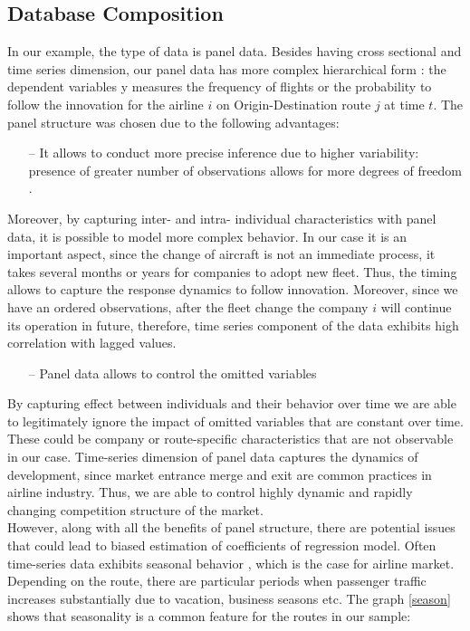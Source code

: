 \documentclass[titlepage, 11pt]{article}
\begin{document}
\subsection{Database Composition} \label{data composition}
\tab In our example, the type of data is panel data. Besides having cross sectional and time series dimension, our panel data has more complex hierarchical form \cite{Hsiao}: the dependent variables y measures the frequency of flights or the probability to follow the innovation for the airline $i$ on Origin-Destination route $j$ at time $t$.  The panel structure was chosen due to the following advantages\cite{Hsiao}: 
\begin{itemize}
\item[--] It allows to conduct more precise inference due to higher variability: presence of greater number of observations allows for more degrees of freedom \cite{Hsiao}.
\end{itemize}
\tab Moreover, by capturing inter- and intra- individual characteristics with panel data, it is possible to model more complex behavior. In our case it is an important aspect, since the change of aircraft is not an immediate process, it takes several months or years for companies to adopt new fleet. Thus, the timing allows to capture the response dynamics to follow innovation. Moreover, since we have an ordered observations, after the fleet change the company $i$ will continue its operation in future, therefore, time series component of the data exhibits high correlation with lagged values.
\begin{itemize}
\item[--] Panel data allows to control the omitted variables \cite{Hsiao}
\end{itemize}
\tab By capturing effect between individuals and their behavior over time we are able to legitimately ignore the impact of omitted variables that are constant over time. These could be company or route-specific characteristics that are not observable in our case. 
Time-series dimension of panel data captures the dynamics of development, since market entrance merge and exit are common practices in airline industry. Thus, we are able to control highly dynamic and rapidly changing competition structure of the market.\\
\tab However, along with all the benefits of panel structure, there are potential issues that could lead to biased estimation of coefficients of regression model. Often time-series data exhibits seasonal behavior \cite{Hsiao}, which is the case for airline market. Depending on the route, there are particular periods when passenger traffic increases substantially due to vacation, business seasons etc. The graph \ref{season} shows that seasonality is a common feature for the routes in our sample: 
\end{document}
